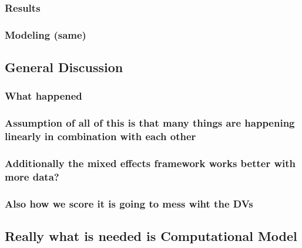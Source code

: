 \documentclass[]{book}
\theoremstyle{definition}
\theoremstyle{definition}
\theoremstyle{definition}
\theoremstyle{remark}
\begin{document}
\hypertarget{results-2}{%
\subsubsection{Results}\label{results-2}}

\hypertarget{modeling-same}{%
\subsubsection{Modeling (same)}\label{modeling-same}}

\hypertarget{general-discussion}{%
\subsection{General Discussion}\label{general-discussion}}

\hypertarget{what-happened}{%
\subsubsection{What happened}\label{what-happened}}

\hypertarget{assumption-of-all-of-this-is-that-many-things-are-happening-linearly-in-combination-with-each-other}{%
\subsubsection{Assumption of all of this is that many things are
happening linearly in combination with each
other}\label{assumption-of-all-of-this-is-that-many-things-are-happening-linearly-in-combination-with-each-other}}

\hypertarget{additionally-the-mixed-effects-framework-works-better-with-more-data}{%
\subsubsection{Additionally the mixed effects framework works better
with more
data?}\label{additionally-the-mixed-effects-framework-works-better-with-more-data}}

\hypertarget{also-how-we-score-it-is-going-to-mess-wiht-the-dvs}{%
\subsubsection{Also how we score it is going to mess wiht the
DVs}\label{also-how-we-score-it-is-going-to-mess-wiht-the-dvs}}

\hypertarget{really-what-is-needed-is-computational-model}{%
\subsection{Really what is needed is Computational
Model}\label{really-what-is-needed-is-computational-model}}
\end{document}
